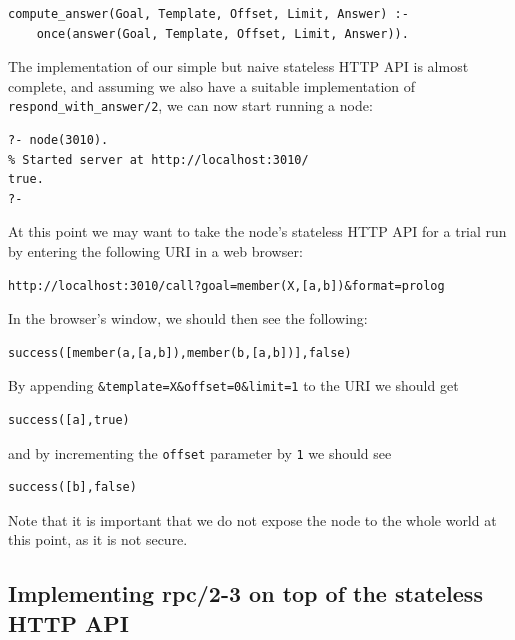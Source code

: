 \begin{verbatim}
compute_answer(Goal, Template, Offset, Limit, Answer) :-
    once(answer(Goal, Template, Offset, Limit, Answer)).
\end{verbatim}

\noindent The implementation of our simple but naive stateless HTTP API is almost complete, and assuming we also have a suitable implementation of \texttt{respond\_with\_answer/2}, we can now start running a node:

\begin{verbatim}
?- node(3010).
% Started server at http://localhost:3010/
true.
?- 
\end{verbatim}

\noindent At this point we may want to take the node's stateless HTTP API for a trial run by entering the following URI in a web browser:

\begin{verbatim}
http://localhost:3010/call?goal=member(X,[a,b])&format=prolog
\end{verbatim}

\noindent In the browser's window, we should then see the following:

\begin{verbatim}
success([member(a,[a,b]),member(b,[a,b])],false)
\end{verbatim}

\noindent By appending \texttt{\&template=X\&offset=0\&limit=1} to the URI we should get

\begin{verbatim}
success([a],true)
\end{verbatim}

\noindent and by incrementing the \texttt{offset} parameter by \texttt{1} we should see

\begin{verbatim}
success([b],false)
\end{verbatim}

\noindent Note that it is important that we do not expose the node to the whole world at this point, as it is not secure.

\subsection{Implementing rpc/2-3 on top of the stateless HTTP API}\label{sec:rpc-on-top-of-http}


